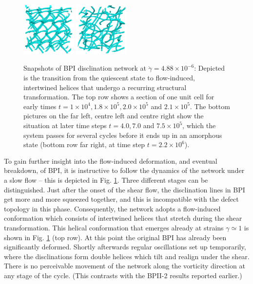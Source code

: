 \documentclass[8.5pt,twoside,twocolumn]{article}
\newcommand{\e}[1]{\times10^{#1}}
\begin{document}
\begin{figure}[htpb]
\includegraphics[width=0.245\textwidth]{disc-xy-750k_run1115.png}
\includegraphics[width=0.245\textwidth]{disc-xy-2200k_run1115.png}
\caption{Snapshots of BPI disclination network at $\dot{\gamma}=4.88\e{-6}$: 
Depicted is the transition from the quiescent state to flow-induced, intertwined 
helices that undergo a recurring structural transformation. The top row
shows a section of one unit cell for early times 
$t=1\e{4}, 1.8\e{5}, 2.0\e{5}$ and $2.1\e{5}$. The bottom 
pictures on the far left, centre left and centre right 
show the situation at later time steps $t=4.0, 7.0$ and $7.5\e{5}$,
which the system passes for several cycles before it ends up in
an amorphous state (bottom row far right, at time step $t=2.2\e{6}$).}
\label{bp1-low}
\end{figure}

\fi


To gain further insight into the flow-induced deformation, and eventual
breakdown, of BPI, it is instructive to follow the dynamics of 
the network under a slow flow -- this is depicted in Fig. \ref{bp1-low}.
Three different stages can be distinguished. 
Just after the onset of the shear flow, the disclination lines 
in BPI get more and more squeezed together, and this is incompatible with
the defect topology in this phase.
Consequently, the network adopts a flow-induced conformation which consists 
of intertwined helices that stretch during the shear transformation.
This helical conformation that emerges already at strains $\gamma\simeq1$ 
is shown in Fig. \ref{bp1-low} (top row).
At this point the original BPI has already been significantly deformed.
Shortly afterwards regular oscillations set up temporarily,
where the disclinations form double helices which tilt and realign under the shear.
There is no perceivable movement of the 
network along the vorticity direction at any stage of the cycle.
(This contrasts with the BPII-2 results reported earlier.)
\end{document}
